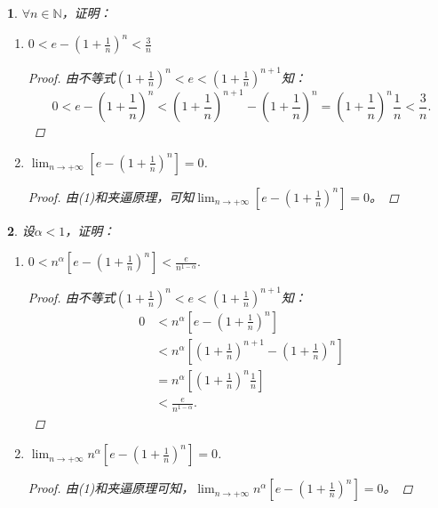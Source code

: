 \documentclass[utf8]{book}
\newtheorem{example}{}[section]             %
\begin{document}
\begin{example}
$\forall n\in\mathbb{N}$，证明：
\renewcommand\labelenumi{\normalfont(\theenumi)}
\begin{enumerate}
\item $0<e-\left(1+\frac{1}{n}\right)^n <\frac{3}{n}$
\begin{proof}
由不等式$\left(1+\frac{1}{n}\right)^n<e<\left(1+\frac{1}{n}\right)^{n+1}$知：
$$0<e-\left(1+\frac{1}{n}\right)^n < \left(1+\frac{1}{n}\right)^{n+1} - \left(1+\frac{1}{n}\right)^{n}=\left(1+\frac{1}{n}\right)^{n}\frac{1}{n}<\frac{3}{n}.$$
\end{proof}
\item $\displaystyle \lim_{n\to +\infty}\left[e-\left(1+\frac{1}{n}\right)^n\right]=0$.
\begin{proof}
由(1)和夹逼原理，可知$\displaystyle \lim_{n\to +\infty}\left[e-\left(1+\frac{1}{n}\right)^n\right] = 0$。
\end{proof}
\end{enumerate}
\end{example}
\begin{example}
设$\alpha<1$，证明：
\renewcommand\labelenumi{\normalfont(\theenumi)}
\begin{enumerate}
\item $\displaystyle  0< n^{\alpha}\left[e-\left(1+\frac{1}{n}\right)^n\right] < \frac{e}{n^{1-\alpha}}.$
\begin{proof}
由不等式$\left(1+\frac{1}{n}\right)^n<e<\left(1+\frac{1}{n}\right)^{n+1}$知：
\begin{equation*}
\begin{split}
0 &< n^{\alpha}\left[e-\left(1+\frac{1}{n}\right)^n\right] \\
&< n^{\alpha}\left[\left(1+\frac{1}{n}\right)^{n+1}-\left(1+\frac{1}{n}\right)^n\right] \\
&=n^{\alpha}\left[\left(1+\frac{1}{n}\right)^n\frac{1}{n}\right] \\&<\frac{e}{n^{1-\alpha}}.
\end{split}
\end{equation*}
\end{proof}
\item $\displaystyle  \lim_{n\to +\infty}n^{\alpha}\left[e-\left(1+\frac{1}{n}\right)^n\right] = 0$.
\begin{proof}
由(1)和夹逼原理可知，$\displaystyle  \lim_{n\to +\infty}n^{\alpha}\left[e-\left(1+\frac{1}{n}\right)^n\right] = 0$。
\end{proof}
\end{enumerate}
\end{example}
\end{document}
